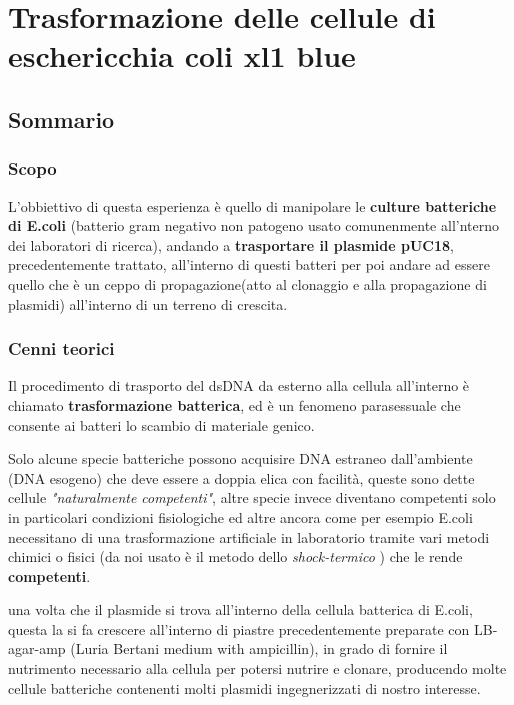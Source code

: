 \section{\LARGE{Trasformazione delle cellule di eschericchia coli xl1 blue}}

\vspace{0.6cm}


\subsection{Sommario}

\subsubsection{Scopo}


L'obbiettivo di questa esperienza è quello di manipolare le \textbf{culture batteriche di E.coli} (batterio gram negativo non patogeno usato comunenmente all'nterno dei laboratori di ricerca), andando a \textbf{trasportare il plasmide pUC18}, precedentemente trattato, all'interno di questi batteri per poi andare ad essere quello che è un ceppo di propagazione(atto al clonaggio e alla propagazione di plasmidi) all'interno di un terreno di crescita.


\subsubsection{Cenni teorici}


Il procedimento di trasporto del dsDNA da esterno alla cellula all'interno è chiamato \textbf{trasformazione batterica}, ed è un fenomeno parasessuale che consente ai batteri lo scambio di materiale genico.


Solo alcune specie batteriche possono acquisire DNA estraneo dall'ambiente (DNA esogeno) che deve essere a doppia elica con facilità, queste sono dette cellule \textit{"naturalmente competenti"}, altre specie invece diventano competenti solo in particolari condizioni fisiologiche ed altre ancora come per esempio E.coli  necessitano di una trasformazione artificiale in laboratorio tramite vari metodi chimici o fisici (da noi usato è il metodo dello \textit{shock-termico} ) che le rende \textbf{competenti}.


una volta che il plasmide si trova all'interno della cellula batterica di E.coli, questa la si fa crescere all'interno di piastre precedentemente preparate con LB-agar-amp (Luria Bertani medium with ampicillin), in grado di fornire il nutrimento necessario alla cellula per potersi nutrire e clonare, producendo molte cellule batteriche contenenti molti plasmidi ingegnerizzati di nostro interesse.

